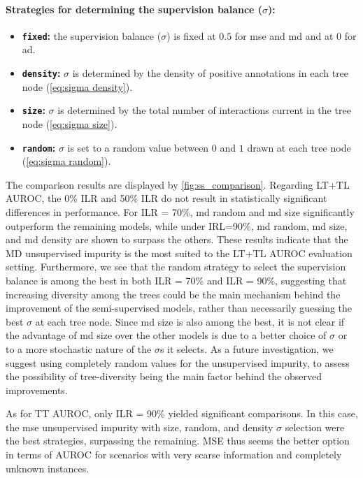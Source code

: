 \paragraph*{Strategies for determining the supervision balance ($\sigma$):}
\begin{itemize}
    \item \textbf{\texttt{fixed}:} the supervision balance ($\sigma$) is fixed at $0.5$ for mse and md and at $0$ for ad.
    \item \textbf{\texttt{density}:} $\sigma$ is determined by the density of positive annotations in each tree node (\autoref{eq:sigma density}). 
    \item \textbf{\texttt{size}:} $\sigma$ is determined by the total number of interactions current in the tree node (\autoref{eq:sigma size}).
    \item \textbf{\texttt{random}:} $\sigma$ is set to a random value between $0$ and $1$ drawn at each tree node (\autoref{eq:sigma random}).
\end{itemize}

The comparison results are displayed by \autoref{fig:ss_comparison}.
%
Regarding LT+TL AUROC, the 0\% ILR and 50\% ILR do not result in statistically significant differences in performance. For ILR = 70\%, md random and md size significantly outperform the remaining models, while under IRL=90\%, md random, md size, and md density are shown to surpass the others. These results indicate that the MD unsupervised impurity is the most suited to the LT+TL AUROC evaluation setting. Furthermore, we see that the random strategy to select the supervision balance %
is among the best in both ILR = 70\% and ILR = 90\%, suggesting that increasing diversity among the trees could be the main mechanism behind the improvement of the semi-supervised models, rather than necessarily guessing the best $\sigma$ at each tree node. Since md size is also among the best, it is not clear if the advantage of md size over the other models is due to a better choice of $\sigma$ or to a more stochastic nature of the $\sigma$s it selects.
%
%
As a future investigation, we suggest using completely random values for the unsupervised impurity, to assess the possibility of tree-diversity being the main factor behind the observed improvements.

As for TT AUROC, only ILR = 90\% yielded significant comparisons. In this case, the mse unsupervised impurity with size, random, and density $\sigma$ selection were the best strategies, surpassing the remaining. MSE thus seems the better option in terms of AUROC for scenarios with very scarse information and completely unknown instances.

